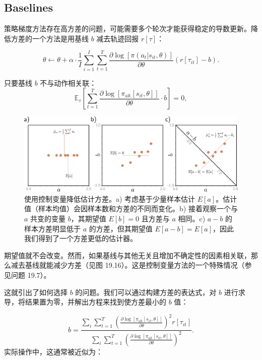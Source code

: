 \subsection{Baselines}
策略梯度方法存在高方差的问题，可能需要多个轮次才能获得稳定的导数更新。降低方差的一个方法是用基线 \(b\) 减去轨迹回报 \(r[\tau]\)：

\begin{equation}
\theta \leftarrow \theta + \alpha \cdot \frac{1}{I} \sum_{i=1}^{I} \sum_{t=1}^{T} \frac{\partial \log [\pi(a_t|s_{it}, \theta)]}{\partial \theta} (r[\tau_{it}] - b). 
\end{equation}

只要基线 \(b\) 不与动作相关联：
\begin{equation}
\mathbb{E}_{\tau}\left[ \sum_{t=1}^T \frac{\partial \log[\pi_{\text{ait}}[s_{it}, \theta]]}{\partial \theta} \cdot b \right] = 0, 
\end{equation}

\begin{figure}[ht!]
\centering
\includegraphics[width=0.7\linewidth]{png/chapter19/ReinforcementVariance.png}
\caption{使用控制变量降低估计方差。a) 考虑基于少量样本估计 \(E[a]\)。估计值（样本均值）会因样本数和方差的不同而变化。b) 接着观察一个与 \(a\) 共变的变量 \(b\)，其期望值 \(E[b] = 0\) 且方差与 \(a\) 相同。c) \(a - b\) 的样本方差明显低于 \(a\) 的方差，但其期望值 \(E[a - b] = E[a]\)，因此我们得到了一个方差更低的估计器。}
\end{figure}

期望值就不会改变。然而，如果基线与其他无关且增加不确定性的因素相关联，那么减去基线就能减少方差（见图 19.16）。这是控制变量方法的一个特殊情况（参见问题 19.7）。

这就引出了如何选择 \(b\) 的问题。我们可以通过构建方差的表达式，对 \(b\) 进行求导，将结果置为零，并解出方程来找到使方差最小的 \(b\) 值：

\begin{equation}
b = \frac{\sum_{i} \sum_{t=1}^T (\frac{\partial \log[\pi_{\text{ait}}[s_{it}, \theta]]}{\partial \theta})^2 r[\tau_{it}]}{\sum_{i} \sum_{t=1}^T (\frac{\partial \log[\pi_{\text{ait}}[s_{it}, \theta]]}{\partial \theta})^2 }. 
\end{equation}
实际操作中，这通常被近似为：


